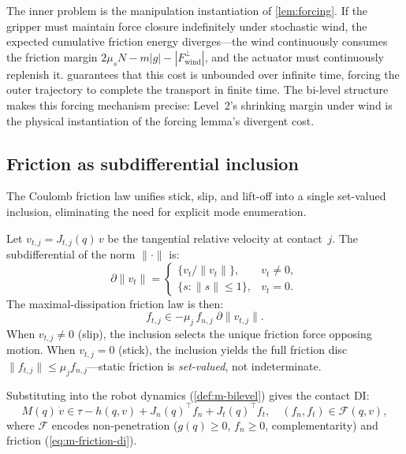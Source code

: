 \begin{remark}
\label{rem:m-forcing}
The inner problem is the manipulation instantiation of
\cref{lem:forcing}.  If the gripper must maintain force closure
indefinitely under stochastic wind, the expected cumulative
friction energy diverges---the wind continuously consumes the
friction margin $2\mu_s N - m|g| - |F_\mathrm{wind}^\perp|$,
and the actuator must continuously replenish it.
 guarantees that this cost is unbounded
over infinite time, forcing the outer trajectory to complete
the transport in finite time.  The bi-level structure makes
this forcing mechanism precise: Level~2's shrinking margin
under wind is the physical instantiation of the forcing
lemma's divergent cost.
\end{remark}

\subsection{Friction as subdifferential inclusion}
\label{sec:m-friction-di}

The Coulomb friction law unifies stick, slip, and lift-off
into a single set-valued inclusion, eliminating the need for
explicit mode enumeration.

Let $v_{t,j} = J_{t,j}(q)\,v$ be the tangential relative
velocity at contact~$j$.  The subdifferential of the norm
$\|\cdot\|$ is:
\[
  \partial \|v_t\| =
  \begin{cases}
    \{v_t / \|v_t\|\}, & v_t \neq 0, \\
    \{s : \|s\| \leq 1\}, & v_t = 0.
  \end{cases}
\]
The maximal-dissipation friction law is then:
\begin{equation}\label{eq:m-friction-di}
  f_{t,j} \in -\mu_j\,f_{n,j}\;\partial\|v_{t,j}\|.
\end{equation}
When $v_{t,j} \neq 0$ (slip), the inclusion selects the unique
friction force opposing motion.  When $v_{t,j} = 0$ (stick),
the inclusion yields the full friction disc
$\|f_{t,j}\| \leq \mu_j f_{n,j}$---static friction is
\emph{set-valued}, not indeterminate.

Substituting into the robot dynamics
(\cref{def:m-bilevel}) gives the contact DI:
\begin{equation}\label{eq:m-contact-di}
  M(q)\,\dot{v} \in \tau - h(q,v)
  + J_n(q)^\top f_n + J_t(q)^\top f_t,
  \quad
  (f_n, f_t) \in \mathcal{F}(q, v),
\end{equation}
where $\mathcal{F}$ encodes non-penetration ($g(q) \geq 0$,
$f_n \geq 0$, complementarity) and friction
(\cref{eq:m-friction-di}).


